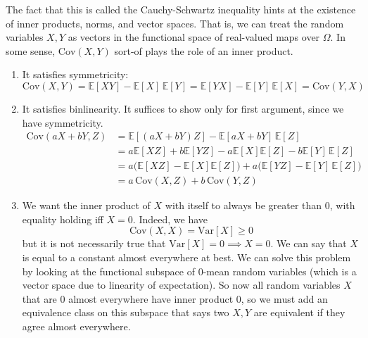     The fact that this is called the Cauchy-Schwartz inequality hints at the existence of inner products, norms, and vector spaces. That is, we can treat the random variables $X, Y$ as vectors in the functional space of real-valued maps over $\Omega$. In some sense, $\mathrm{Cov}(X, Y)$ sort-of plays the role of an inner product. 
    \begin{enumerate}
      \item It satisfies symmetricity: 
      \begin{equation}
        \mathrm{Cov}(X, Y) = \mathbb{E}[X Y] - \mathbb{E}[X] \, \mathbb{E}[Y] =  \mathbb{E}[Y X] - \mathbb{E}[Y] \, \mathbb{E}[X] = \mathrm{Cov}(Y, X)
      \end{equation}
      
      \item It satisfies binlinearity. It suffices to show only for first argument, since we have symmetricity. 
      \begin{align*}
        \mathrm{Cov}(aX + bY, Z) & = \mathbb{E}[(a X + b Y) Z] - \mathbb{E}[a X + b Y] \, \mathbb{E}[Z] \\
        & = a \mathbb{E}[X Z] + b \mathbb{E}[Y Z] - a \mathbb{E}[X] \mathbb{E}[Z] - b \mathbb{E}[Y] \, \mathbb{E}[Z] \\
        & = a \big( \mathbb{E}[X Z] - \mathbb{E}[X] \mathbb{E}[Z] \big) + a \big( \mathbb{E}[Y Z] - \mathbb{E}[Y] \, \mathbb{E}[Z] \big) \\
        & = a \, \mathrm{Cov}(X, Z) + b \, \mathrm{Cov}(Y, Z)
      \end{align*}

      \item We want the inner product of $X$ with itself to always be greater than $0$, with equality holding iff $X = 0$. Indeed, we have 
      \begin{equation}
        \mathrm{Cov}(X, X) = \mathrm{Var}[X] \geq 0
      \end{equation}
      but it is not necessarily true that $\mathrm{Var}[X] = 0 \implies X = 0$. We can say that $X$ is equal to a constant almost everywhere at best. We can solve this problem by looking at the functional subspace of $0$-mean random variables (which is a vector space due to linearity of expectation). So now all random variables $X$ that are $0$ almost everywhere have inner product $0$, so we must add an equivalence class on this subspace that says two $X, Y$ are equivalent if they agree almost everywhere. 
    \end{enumerate}

